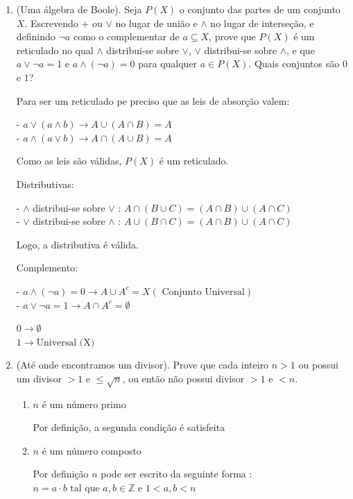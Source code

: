 \begin{enumerate}[label=1.\arabic*.]
\begin{enumerate}[label=\roman*.]
    Logo, $x = y$

\end{enumerate}

\item (Uma álgebra de Boole). Seja $P(X)$ o conjunto das partes de um conjunto $X$. 
Escrevendo $+$ ou $\vee$ no lugar de união e $\wedge$ no lugar de interseção, e 
definindo $\neg a$ como o complementar de $a\subseteq X$, prove que $P(X)$ é um reticulado 
no qual $\wedge$ distribui-se sobre $\vee$, $\vee$ distribui-se sobre $\wedge$, e que 
$a\vee \neg a = 1 $ e $a\wedge(\neg a)=0$ para qualquer $a\in P(X)$. Quais conjuntos são $0$ e $1$?

Para ser um reticulado pe preciso que as leis de absorção valem:

- $a \vee (a \wedge b) \rightarrow A \cup (A \cap B ) = A$ \\
- $a \wedge (a \vee b) \rightarrow A \cap (A \cup B ) = A$

Como as leis são válidas, $P(X)$ é um reticulado.

Distributivas:

- $\wedge$ distribui-se sobre $\vee$ : $A \cap (B \cup C) = (A \cap B) \cup (A \cap C)$\\
- $\vee$ distribui-se sobre $\wedge$ : $A \cup (B \cap C) = (A \cap B) \cup (A \cap C)$

Logo, a distributiva é válida.

Complemento:

- $a \wedge ( \neg a ) = 0 \rightarrow A \cup A^c = X (\text{ Conjunto Universal})$ \\
- $ a \vee \neg a = 1 \rightarrow A \cap A^c = \emptyset$ 

$0 \rightarrow \emptyset$ \\ 
$1 \rightarrow \text{Universal (X)}$  

\item (Até onde encontramos um divisor). Prove que cada inteiro $n>1$ ou possui um divisor 
$>1$ e $\le\sqrt{n}$, ou então não possui divisor $>1$ e $<n$.

\begin{enumerate}[label=\Roman*.]
    
    \item $n$ é um número primo
    
    Por definição, a segunda condição é satisfeita

    \item $n$ é um número composto

    Por definição $n$ pode ser escrito da seguinte forma : $n = a \cdot b \text{ tal que } a,b \in \mathbb{Z}$ e
    $1 < a,b < n$ 
    

\end{enumerate}
\end{enumerate}
